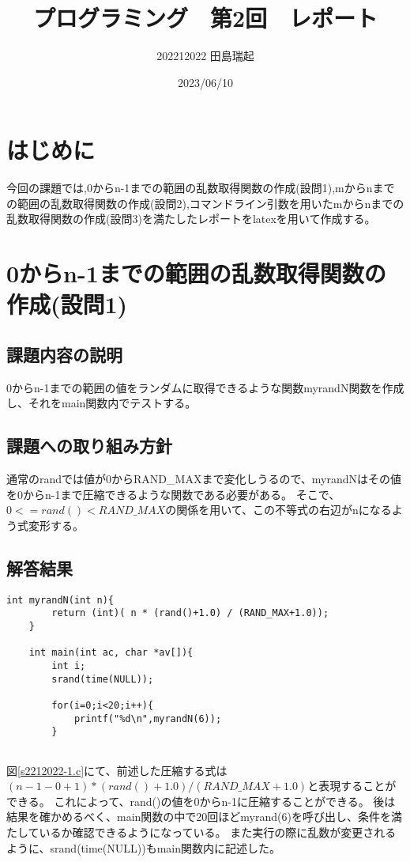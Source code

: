 \documentclass[fontsize = 10pt, paper= a4]{jlreq}
\begin{document}
\title{プログラミング　第2回　レポート}
\author{202212022 田島瑞起}
\date{2023/06/10}
\maketitle

\section{はじめに}
今回の課題では,0からn-1までの範囲の乱数取得関数の作成(設問1),mからnまでの範囲の乱数取得関数の作成(設問2),コマンドライン引数を用いたmからnまでの乱数取得関数の作成(設問3)を満たしたレポートをlatexを用いて作成する。
\section{0からn-1までの範囲の乱数取得関数の作成(設問1)}
\subsection{課題内容の説明}
0からn-1までの範囲の値をランダムに取得できるような関数myrandN関数を作成し、それをmain関数内でテストする。
\subsection{課題への取り組み方針}
通常のrandでは値が0からRAND\_MAXまで変化しうるので、myrandNはその値を0からn-1まで圧縮できるような関数である必要がある。
そこで、$ 0 <= rand() < RAND\_MAX $の関係を用いて、この不等式の右辺がnになるよう式変形する。
\subsection{解答結果}

\begin{lstlisting}[basicstyle=\ttfamily\footnotesize, frame=single, caption=s2212022-1.c ,label=s2212022-1.c]
    int myrandN(int n){
        return (int)( n * (rand()+1.0) / (RAND_MAX+1.0));
    }
    
    int main(int ac, char *av[]){
        int i;
        srand(time(NULL));
    
        for(i=0;i<20;i++){
            printf("%d\n",myrandN(6));
        }
    
\end{lstlisting}

図\ref{s2212022-1.c}にて、前述した圧縮する式は$ (n-1 -0 + 1) * (rand()+1.0) / (RAND\_MAX+1.0) $と表現することができる。
これによって、rand()の値を0からn-1に圧縮することができる。
後は結果を確かめるべく、main関数の中で20回ほどmyrand(6)を呼び出し、条件を満たしているか確認できるようになっている。
また実行の際に乱数が変更されるように、srand(time(NULL))もmain関数内に記述した。
\end{document}
